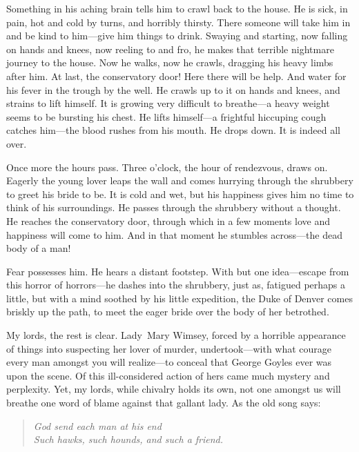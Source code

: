 \begin{dialogue}
Something in his aching brain tells him to crawl back to the house. He is sick, in pain, hot and cold by turns, and horribly thirsty. There someone will take him in and be kind to him—give him things to drink. Swaying and starting, now falling on hands and knees, now reeling to and fro, he makes that terrible nightmare journey to the house. Now he walks, now he crawls, dragging his heavy limbs after him. At last, the conservatory door! Here there will be help. And water for his fever in the trough by the well. He crawls up to it on hands and knees, and strains to lift himself. It is growing very difficult to breathe—a heavy weight seems to be bursting his chest. He lifts himself—a frightful hiccuping cough catches him—the blood rushes from his mouth. He drops down. It is indeed all over.



Once more the hours pass. Three o'clock, the hour of rendezvous, draws on. Eagerly the young lover leaps the wall and comes hurrying through the shrubbery to greet his bride to be. It is cold and wet, but his happiness gives him no time to think of his surroundings. He passes through the shrubbery without a thought. He reaches the conservatory door, through which in a few moments love and happiness will come to him. And in that moment he stumbles across—the dead body of a man!



Fear possesses him. He hears a distant footstep. With but one idea—escape from this horror of horrors—he dashes into the shrubbery, just as, fatigued perhaps a little, but with a mind soothed by his little expedition, the Duke of Denver comes briskly up the path, to meet the eager bride over the body of her betrothed.



My lords, the rest is clear. Lady~Mary Wimsey, forced by a horrible appearance of things into suspecting her lover of murder, undertook—with what courage every man amongst you will realize—to conceal that George Goyles ever was upon the scene. Of this ill-considered action of hers came much mystery and perplexity. Yet, my lords, while chivalry holds its own, not one amongst us will breathe one word of blame against that gallant lady. As the old song says:

\begin{quote}\itshape
God send each man at his end\\
Such hawks, such hounds, and such a friend.\\
\end{quote}


\end{dialogue}
